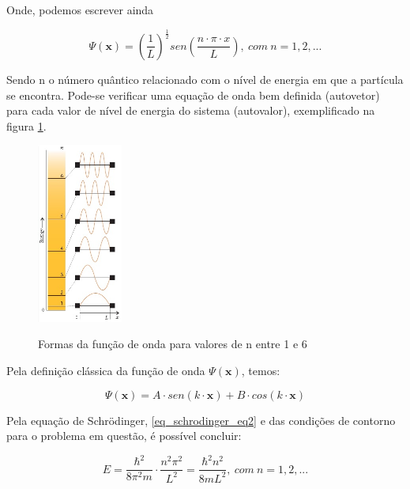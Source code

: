    \par Onde, podemos escrever ainda

    \begin{equation}\label{eq_schrodinger_eq1}
      \Psi(\mathbf{x}) = \left(\frac{1}{L}\right)^\frac{1}{2} sen\left(\frac{n \cdot \pi \cdot x}{L}\right),\ com\ n = 1, 2, ...
    \end{equation}

    \par Sendo n o número quântico relacionado com o nível de energia em que a partícula se encontra. Pode-se verificar uma equação de onda bem definida (autovetor) para cada valor de nível de energia do sistema (autovalor), exemplificado na figura \ref{fig1}\cite{frustrado2}.

    \begin{figure}[H]
      \caption{Formas da função de onda para valores de n entre 1 e 6}
      \centering
      \includegraphics[width=0.25\textwidth]{images/figura1.png}
      \label{fig1}
    \end{figure}

    \par Pela definição clássica da função de onda $\Psi(\mathbf{x})$, temos:

    \begin{equation}\label{eq_schrodinger_eq2}
        \Psi (\mathbf{x}) = A \cdot sen(k \cdot \mathbf{x}) + B \cdot cos(k \cdot \mathbf{x})
    \end{equation}

    \par Pela equação de Schrödinger, \eqref{eq_schrodinger_eq2} e das condições de contorno para o problema em questão, é possível concluir:

    \begin{equation}\label{eq_schrodinger_eq3}
      E = \frac{\hbar^2}{8 \pi^2 m} \cdot \frac{n^2\pi^2}{L^2} = \frac{\hbar^2 n^2}{8 m L^2},\ com\ n = 1, 2, ...
    \end{equation}

